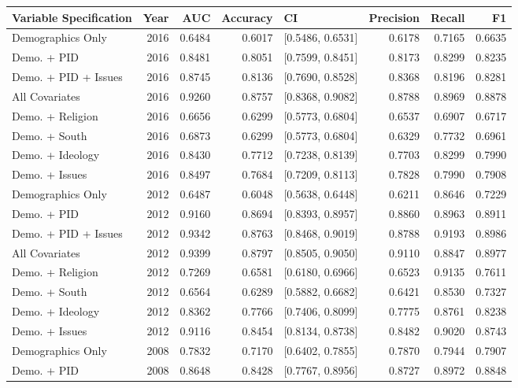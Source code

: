 \begin{longtable}{lrrrlrrr}
  \toprule
Variable Specification & Year & AUC & Accuracy & CI & Precision & Recall & F1 \\ 
  \midrule
Demographics Only & 2016 & 0.6484 & 0.6017 & [0.5486, 0.6531] & 0.6178 & 0.7165 & 0.6635 \\ 
  Demo. + PID & 2016 & 0.8481 & 0.8051 & [0.7599, 0.8451] & 0.8173 & 0.8299 & 0.8235 \\ 
  Demo. + PID + Issues & 2016 & 0.8745 & 0.8136 & [0.7690, 0.8528] & 0.8368 & 0.8196 & 0.8281 \\ 
  All Covariates & 2016 & 0.9260 & 0.8757 & [0.8368, 0.9082] & 0.8788 & 0.8969 & 0.8878 \\ 
  Demo. + Religion & 2016 & 0.6656 & 0.6299 & [0.5773, 0.6804] & 0.6537 & 0.6907 & 0.6717 \\ 
  Demo. + South & 2016 & 0.6873 & 0.6299 & [0.5773, 0.6804] & 0.6329 & 0.7732 & 0.6961 \\ 
  Demo. + Ideology & 2016 & 0.8430 & 0.7712 & [0.7238, 0.8139] & 0.7703 & 0.8299 & 0.7990 \\ 
  Demo. + Issues & 2016 & 0.8497 & 0.7684 & [0.7209, 0.8113] & 0.7828 & 0.7990 & 0.7908 \\ 
  Demographics Only & 2012 & 0.6487 & 0.6048 & [0.5638, 0.6448] & 0.6211 & 0.8646 & 0.7229 \\ 
  Demo. + PID & 2012 & 0.9160 & 0.8694 & [0.8393, 0.8957] & 0.8860 & 0.8963 & 0.8911 \\ 
  Demo. + PID + Issues & 2012 & 0.9342 & 0.8763 & [0.8468, 0.9019] & 0.8788 & 0.9193 & 0.8986 \\ 
  All Covariates & 2012 & 0.9399 & 0.8797 & [0.8505, 0.9050] & 0.9110 & 0.8847 & 0.8977 \\ 
  Demo. + Religion & 2012 & 0.7269 & 0.6581 & [0.6180, 0.6966] & 0.6523 & 0.9135 & 0.7611 \\ 
  Demo. + South & 2012 & 0.6564 & 0.6289 & [0.5882, 0.6682] & 0.6421 & 0.8530 & 0.7327 \\ 
  Demo. + Ideology & 2012 & 0.8362 & 0.7766 & [0.7406, 0.8099] & 0.7775 & 0.8761 & 0.8238 \\ 
  Demo. + Issues & 2012 & 0.9116 & 0.8454 & [0.8134, 0.8738] & 0.8482 & 0.9020 & 0.8743 \\ 
  Demographics Only & 2008 & 0.7832 & 0.7170 & [0.6402, 0.7855] & 0.7870 & 0.7944 & 0.7907 \\ 
  Demo. + PID & 2008 & 0.8648 & 0.8428 & [0.7767, 0.8956] & 0.8727 & 0.8972 & 0.8848 \\ 

\end{longtable}
